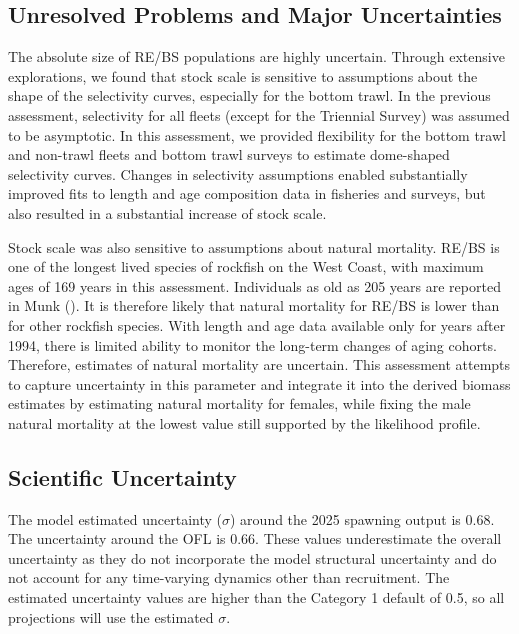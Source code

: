 \documentclass[
]{scrartcl}
\begin{document}
\endgroup

\subsection*{Unresolved Problems and Major
Uncertainties}\label{unresolved-problems-and-major-uncertainties}

The absolute size of RE/BS populations are highly uncertain. Through
extensive explorations, we found that stock scale is sensitive to
assumptions about the shape of the selectivity curves, especially for
the bottom trawl. In the previous assessment, selectivity for all fleets
(except for the Triennial Survey) was assumed to be asymptotic. In this
assessment, we provided flexibility for the bottom trawl and non-trawl
fleets and bottom trawl surveys to estimate dome-shaped selectivity
curves. Changes in selectivity assumptions enabled substantially
improved fits to length and age composition data in fisheries and
surveys, but also resulted in a substantial increase of stock scale.

Stock scale was also sensitive to assumptions about natural mortality.
RE/BS is one of the longest lived species of rockfish on the West Coast,
with maximum ages of 169 years in this assessment. Individuals as old as
205 years are reported in Munk
(). It is therefore
likely that natural mortality for RE/BS is lower than for other rockfish
species. With length and age data available only for years after 1994,
there is limited ability to monitor the long-term changes of aging
cohorts. Therefore, estimates of natural mortality are uncertain. This
assessment attempts to capture uncertainty in this parameter and
integrate it into the derived biomass estimates by estimating natural
mortality for females, while fixing the male natural mortality at the
lowest value still supported by the likelihood profile.

\subsection*{Scientific Uncertainty}\label{scientific-uncertainty}

The model estimated uncertainty (\(\sigma\)) around the 2025 spawning
output is 0.68. The uncertainty around the OFL is 0.66. These values
underestimate the overall uncertainty as they do not incorporate the
model structural uncertainty and do not account for any time-varying
dynamics other than recruitment. The estimated uncertainty values are
higher than the Category 1 default of 0.5, so all projections will use
the estimated \(\sigma\).
\end{document}

